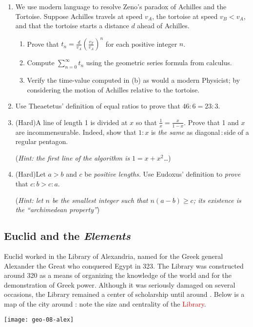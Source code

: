 \begin{exercises}{}{}
\begin{enumerate}
		
		\item We use modern language to resolve Zeno's paradox of Achilles and the Tortoise. Suppose Achilles travels at speed $v_A$, the tortoise at speed $v_B<v_A$, and that the tortoise starts a distance $d$ ahead of Achilles.
		\begin{enumerate}
		  \item Prove that $t_n=\frac d{v_A}\left(\frac{v_T}{v_A}\right)^{n}$ for each positive integer $n$.
		  \item Compute $\sum_{n=0}^\infty t_n$ using the geometric series formula from calculus.
		  \item Verify the time-value computed in (b) as would a modern Physicist; by considering the motion of Achilles relative to the tortoise.
		\end{enumerate} 
		
	  
	  \item%
		Use Theaetetus' definition of equal ratios to prove that $46:6=23:3$.
	  
	  
	  \item%
	  (Hard)\lstsp A line of length 1 is divided at $x$ so that $\frac 1x=\frac x{1-x}$. Prove that 1 and $x$ are incommensurable. Indeed, show that $1:x$ is \emph{the same} as diagonal\,:\,side of a regular pentagon.\par
	  (\emph{Hint: the first line of the algorithm is $1=x+x^2$\ldots})
	  
	  
	  \item%
	  (Hard)\lstsp Let $a>b$ and $c$ be \emph{positive lengths.} Use Eudoxus' definition to \emph{prove} that $c:b>c:a$.\par
	  (\emph{Hint: let $n$ be the smallest integer such that $n(a-b)\ge c$; its existence is the ``archimedean property''})
	\end{enumerate}
\end{exercises}


\clearpage



\subsection{Euclid and the \emph{Elements}}

\begin{minipage}[t]{0.70\linewidth}\vspace{-8pt}
	Euclid worked in the Library of Alexandria, named for the Greek general Alexander the Great who conquered Egypt in 323\BC. The Library was constructed around 320\BC{} as a means of organizing the knowledge of the world and for the demonstration of Greek power. Although it was seriously damaged on several occasions, the Library remained a center of scholarship until around . Below is a map of the city around : note the size and centrality of the \textcolor{red}{Library}.
\end{minipage}
\hfill
\begin{minipage}[t]{0.29\linewidth}\vspace{-25pt}
	\flushright
	\texttt{[image: geo-08-alex]}
\end{minipage}\par

